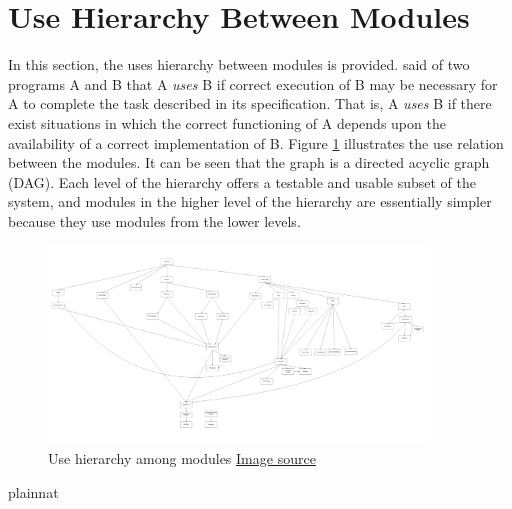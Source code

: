 \documentclass[12pt, titlepage]{article}
\begin{document}
\section{Use Hierarchy Between Modules} \label{SecUse}

In this section, the uses hierarchy between modules is
provided. \citet{Parnas1978} said of two programs A and B that A {\em uses} B if
correct execution of B may be necessary for A to complete the task described in
its specification. That is, A {\em uses} B if there exist situations in which
the correct functioning of A depends upon the availability of a correct
implementation of B.  Figure \ref{FigUH} illustrates the use relation between
the modules. It can be seen that the graph is a directed acyclic graph
(DAG). Each level of the hierarchy offers a testable and usable subset of the
system, and modules in the higher level of the hierarchy are essentially simpler
because they use modules from the lower levels.

\begin{figure}[H]
	\centering
	\includegraphics[width=0.9\textwidth]{mgdiagram.png}
	\caption{Use hierarchy among modules \href{mgdiagram.png}{Image source}}
	\label{FigUH}
\end{figure}


 {plainnat}

\end{document}
